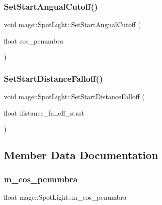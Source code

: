 \hypertarget{classmage_1_1_spot_light_a5059fe33404d452a57584e8473de8be4}{}\label{classmage_1_1_spot_light_a5059fe33404d452a57584e8473de8be4} 
\subsubsection{\texorpdfstring{Set\+Start\+Angual\+Cutoff()}{SetStartAngualCutoff()}}
{\footnotesize\ttfamily void mage\+::\+Spot\+Light\+::\+Set\+Start\+Angual\+Cutoff (\begin{DoxyParamCaption}\item[{float}]{cos\+\_\+penumbra }\end{DoxyParamCaption})}

\hypertarget{classmage_1_1_spot_light_a2290be4221f8a399139920b70f5403a0}{}\label{classmage_1_1_spot_light_a2290be4221f8a399139920b70f5403a0} 
\subsubsection{\texorpdfstring{Set\+Start\+Distance\+Falloff()}{SetStartDistanceFalloff()}}
{\footnotesize\ttfamily void mage\+::\+Spot\+Light\+::\+Set\+Start\+Distance\+Falloff (\begin{DoxyParamCaption}\item[{float}]{distance\+\_\+falloff\+\_\+start }\end{DoxyParamCaption})}



\subsection{Member Data Documentation}
\hypertarget{classmage_1_1_spot_light_ac5d9f3426397abff72c5098b6e7e8472}{}\label{classmage_1_1_spot_light_ac5d9f3426397abff72c5098b6e7e8472} 
\subsubsection{\texorpdfstring{m\+\_\+cos\+\_\+penumbra}{m\_cos\_penumbra}}
{\footnotesize\ttfamily float mage\+::\+Spot\+Light\+::m\+\_\+cos\+\_\+penumbra\hspace{0.3cm}{\ttfamily [private]}}

